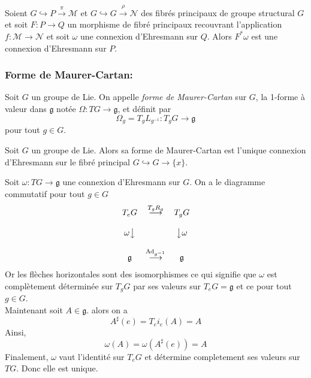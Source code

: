 \documentclass[12pt, a4paper]{book}
\begin{document}
\begin{pro}
Soient $G \hookrightarrow P \overset{\pi}{\to} \mathcal{M}$ et $G \hookrightarrow G \overset{\rho}{\to} \mathcal{N}$ des fibrés principaux de groupe structural $G$ et soit $F: P\to Q$ un morphisme de fibré principaux recouvrant l'application $f: \mathcal{M} \to \mathcal{N}$ et soit $\omega$ une connexion d'Ehresmann sur $Q$. Alors $F^*\omega$ est une connexion d'Ehresmann sur $P$.
\end{pro}

\subsubsection{Forme de Maurer-Cartan:}

\begin{defi}
Soit $G$ un groupe de Lie. On appelle \emph{forme de Maurer-Cartan} sur $G$, la 1-forme à valeur dans $\mathfrak{g}$ notée $\Omega : TG \to \mathfrak{g}$, et définit par 
$$\Omega_g = T_gL_{g^{-1}} : T_gG \to \mathfrak{g}$$
pour tout $g\in G$.
\end{defi}

\begin{pro}
Soit $G$ un groupe de Lie. Alors sa forme de Maurer-Cartan est l'unique connexion d'Ehresmann sur le fibré principal $G \hookrightarrow G \to \{x\}$.
\end{pro}
\begin{preu}
Soit $\omega: TG \to \mathfrak{g}$ une connexion d'Ehresmann sur $G$. On a le diagramme commutatif pour tout $g\in G$
$$\begin{matrix}
T_eG  & \overset{T_gR_{g}}{\longrightarrow} & T_gG \\ \\
\omega\big\downarrow &  & \big\downarrow\omega \\ \\
\mathfrak{g} & \overset{\operatorname{Ad}_{g^{-1}}}{\longrightarrow} & \mathfrak{g}
\end{matrix}
$$
Or les flèches horizontales sont des isomorphismes ce qui signifie que $\omega$ est complètement déterminée sur $T_gG$ par ses valeurs sur $T_eG = \mathfrak{g}$ et ce pour tout $g\in G$. \\
Maintenant soit $A\in \mathfrak{g}$. alors on a
$$A^\sharp(e) = T_ei_e(A) = A$$
Ainsi, 
$$\omega(A) = \omega(A^\sharp(e)) = A$$
Finalement, $\omega$ vaut l'identité sur $T_eG$ et détermine completement ses valeurs sur $TG$. Donc elle est unique.
\end{preu}
\end{document}
